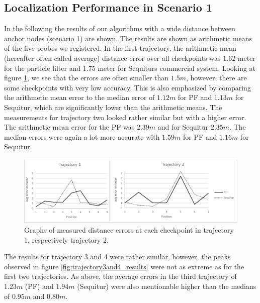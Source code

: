\subsection{Localization Performance in Scenario 1}
In the following the results of our algorithms with a wide distance between anchor nodes (scenario 1) are shown. The results are shown as arithmetic means of the five probes we registered. In the first trajectory, the arithmetic mean (hereafter often called average) distance error over all checkpoints was $1.62$ meter for the particle filter and $1.75$ meter for Sequiturs commercial system. Looking at figure \ref{fig:trajectory1and2_results}, we see that the errors are often smaller than $1.5m$, however, there are some checkpoints with very low accuracy. This is also emphasized by comparing the arithmetic mean error to the median error of $1.12m$ for PF and $1.13m$ for Sequitur, which are significantly lower than the arithmetic means. The measurements for trajectory two looked rather similar but with a higher error. The arithmetic mean error for the PF was $2.39m$ and for Sequitur $2.35m$. The median errors were again a lot more accurate with $1.59m$ for PF and $1.16m$ for Sequitur.
\begin{figure}[th]
\centering
\includegraphics[width=1.0\textwidth]{Figures/trajectory1_2_results}
\decoRule
\caption[Localization Results of Trajectory 1 and 2]{Graphs of measured distance errors at each checkpoint in trajectory 1, respectively trajectory 2.}
\label{fig:trajectory1and2_results}
\end{figure}
The results for trajectory 3 and 4 were rather similar, however, the peaks observed in figure \ref{fig:trajectory3and4_results} were not as extreme as for the first two trajectories. As above, the average errors in the third trajectory of $1.23m$ (PF) and $1.94m$ (Sequitur) were also mentionable higher than the medians of $0.95m$ and $0.80m$.
